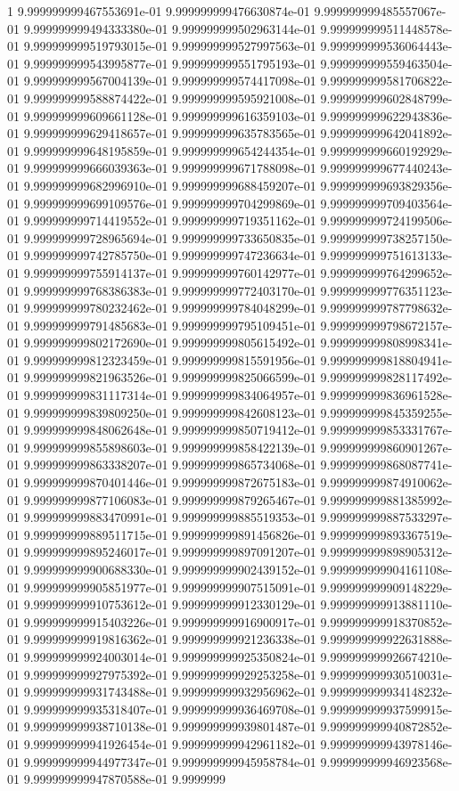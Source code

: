 1	9.999999999467553691e-01	9.999999999476630874e-01	9.999999999485557067e-01	9.999999999494333380e-01	9.999999999502963144e-01	9.999999999511448578e-01	9.999999999519793015e-01	9.999999999527997563e-01	9.999999999536064443e-01	9.999999999543995877e-01	9.999999999551795193e-01	9.999999999559463504e-01	9.999999999567004139e-01	9.999999999574417098e-01	9.999999999581706822e-01	9.999999999588874422e-01	9.999999999595921008e-01	9.999999999602848799e-01	9.999999999609661128e-01	9.999999999616359103e-01	9.999999999622943836e-01	9.999999999629418657e-01	9.999999999635783565e-01	9.999999999642041892e-01	9.999999999648195859e-01	9.999999999654244354e-01	9.999999999660192929e-01	9.999999999666039363e-01	9.999999999671788098e-01	9.999999999677440243e-01	9.999999999682996910e-01	9.999999999688459207e-01	9.999999999693829356e-01	9.999999999699109576e-01	9.999999999704299869e-01	9.999999999709403564e-01	9.999999999714419552e-01	9.999999999719351162e-01	9.999999999724199506e-01	9.999999999728965694e-01	9.999999999733650835e-01	9.999999999738257150e-01	9.999999999742785750e-01	9.999999999747236634e-01	9.999999999751613133e-01	9.999999999755914137e-01	9.999999999760142977e-01	9.999999999764299652e-01	9.999999999768386383e-01	9.999999999772403170e-01	9.999999999776351123e-01	9.999999999780232462e-01	9.999999999784048299e-01	9.999999999787798632e-01	9.999999999791485683e-01	9.999999999795109451e-01	9.999999999798672157e-01	9.999999999802172690e-01	9.999999999805615492e-01	9.999999999808998341e-01	9.999999999812323459e-01	9.999999999815591956e-01	9.999999999818804941e-01	9.999999999821963526e-01	9.999999999825066599e-01	9.999999999828117492e-01	9.999999999831117314e-01	9.999999999834064957e-01	9.999999999836961528e-01	9.999999999839809250e-01	9.999999999842608123e-01	9.999999999845359255e-01	9.999999999848062648e-01	9.999999999850719412e-01	9.999999999853331767e-01	9.999999999855898603e-01	9.999999999858422139e-01	9.999999999860901267e-01	9.999999999863338207e-01	9.999999999865734068e-01	9.999999999868087741e-01	9.999999999870401446e-01	9.999999999872675183e-01	9.999999999874910062e-01	9.999999999877106083e-01	9.999999999879265467e-01	9.999999999881385992e-01	9.999999999883470991e-01	9.999999999885519353e-01	9.999999999887533297e-01	9.999999999889511715e-01	9.999999999891456826e-01	9.999999999893367519e-01	9.999999999895246017e-01	9.999999999897091207e-01	9.999999999898905312e-01	9.999999999900688330e-01	9.999999999902439152e-01	9.999999999904161108e-01	9.999999999905851977e-01	9.999999999907515091e-01	9.999999999909148229e-01	9.999999999910753612e-01	9.999999999912330129e-01	9.999999999913881110e-01	9.999999999915403226e-01	9.999999999916900917e-01	9.999999999918370852e-01	9.999999999919816362e-01	9.999999999921236338e-01	9.999999999922631888e-01	9.999999999924003014e-01	9.999999999925350824e-01	9.999999999926674210e-01	9.999999999927975392e-01	9.999999999929253258e-01	9.999999999930510031e-01	9.999999999931743488e-01	9.999999999932956962e-01	9.999999999934148232e-01	9.999999999935318407e-01	9.999999999936469708e-01	9.999999999937599915e-01	9.999999999938710138e-01	9.999999999939801487e-01	9.999999999940872852e-01	9.999999999941926454e-01	9.999999999942961182e-01	9.999999999943978146e-01	9.999999999944977347e-01	9.999999999945958784e-01	9.999999999946923568e-01	9.999999999947870588e-01	9.9999999